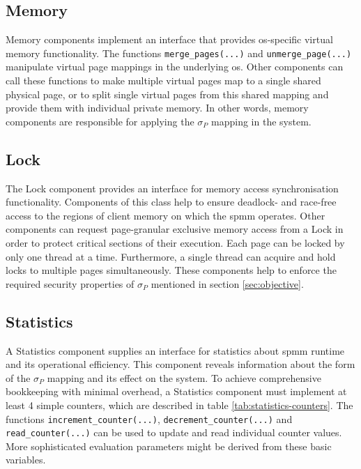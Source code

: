 \subsection*{Memory}
\label{subsec:Memory}

Memory components implement an interface that provides \ac{os}-specific virtual memory functionality.
The functions \texttt{merge\_pages(...)} and \texttt{unmerge\_page(...)} manipulate virtual page mappings in the underlying \ac{os}.
Other components can call these functions to make multiple virtual pages map to a single shared physical page, or to split single virtual pages from this shared mapping and provide them with individual private memory.
In other words, memory components are responsible for applying the $\sigma_P$ mapping in the system.

\subsection*{Lock}
\label{subsec:Lock}

The Lock component provides an interface for memory access synchronisation functionality.
Components of this class help to ensure deadlock- and race-free access to the regions of client memory on which the \ac{spmm} operates.
Other components can request page-granular exclusive memory access from a Lock in order to protect critical sections of their execution.
Each page can be locked by only one thread at a time.
Furthermore, a single thread can acquire and hold locks to multiple pages simultaneously.
These components help to enforce the required security properties of $\sigma_P$ mentioned in section \ref{sec:objective}.

\subsection*{Statistics}
\label{subsec:statistics}

A Statistics component supplies an interface for statistics about \ac{spmm} runtime and its operational efficiency.
This component reveals information about the form of the $\sigma_P$ mapping and its effect on the system.
To achieve comprehensive bookkeeping with minimal overhead, a Statistics component must implement at least 4 simple counters, which are described in table \ref{tab:statistics-counters}.
The functions \texttt{increment\_counter(...)}, \texttt{decrement\_counter(...)} and \texttt{read\_counter(...)} can be used to update and read individual counter values.
More sophisticated evaluation parameters might be derived from these basic variables.

